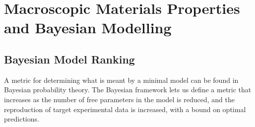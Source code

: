 \chapter{Macroscopic Materials Properties and Bayesian Modelling}
\label{chap:bayes}

\section{}

\section{Bayesian Model Ranking}
A metric for determining what is meant by a minimal model
can be found in Bayesian probability theory. The Bayesian framework 
lets us define a metric that increases as the number of free 
parameters in the model is reduced, and the reproduction of 
target experimental data is increased, with a bound on optimal predictions.

